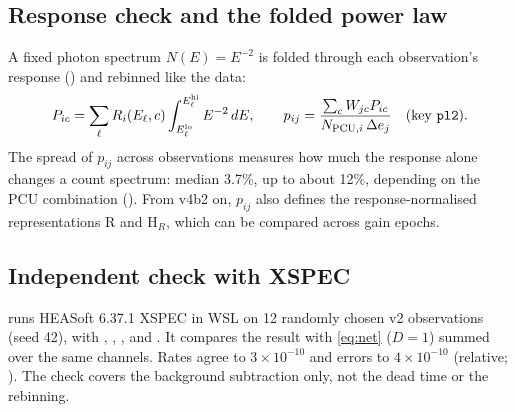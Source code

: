 \subsection{Response check and the folded power law}\label{sec:pl2}
A fixed photon spectrum $N(E)=E^{-2}$ is folded through each observation's response () and
rebinned like the data:
\begin{equation}
P_{ic}=\sum_\ell R_i(E_\ell,c)\int_{E^\mathrm{lo}_\ell}^{E^\mathrm{hi}_\ell}E^{-2}\,dE,\qquad
p_{ij}=\frac{\sum_cW_{jc}P_{ic}}{N_{\mathrm{PCU},i}\,\Delta e_j}\quad(\text{key \texttt{pl2}}).\label{eq:pl2}
\end{equation}
The spread of $p_{ij}$ across observations measures how much the response alone changes a count spectrum: median 3.7\%,
up to about 12\%, depending on the PCU combination (). From v4b2 on, $p_{ij}$ also defines the
response-normalised representations R and H$_R$, which can be compared across gain epochs.

\subsection{Independent check with XSPEC}\label{sec:xspec}
 runs HEASoft 6.37.1 XSPEC in WSL on 12 randomly chosen v2 observations (seed 42), with
, , ,  and . It compares the
result with \cref{eq:net} ($D=1$) summed over the same channels. Rates agree to $3\times10^{-10}$ and errors to
$4\times10^{-10}$ (relative; ). The check covers the background subtraction only,
not the dead time or the rebinning.


